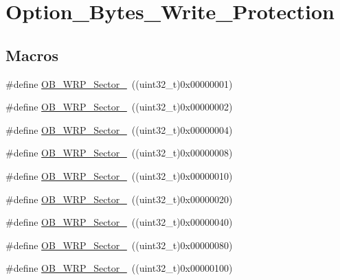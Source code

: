 \hypertarget{group___option___bytes___write___protection}{\section{Option\-\_\-\-Bytes\-\_\-\-Write\-\_\-\-Protection}
\label{group___option___bytes___write___protection}
}
\subsection*{Macros}
\begin{DoxyCompactItemize}
\item 
\#define \hyperlink{group___option___bytes___write___protection_gaff0ba34d35179bdc6e2f09d6813290f6}{O\-B\-\_\-\-W\-R\-P\-\_\-\-Sector\-\_}~((uint32\-\_\-t)0x00000001)
\item 
\#define \hyperlink{group___option___bytes___write___protection_gac9644173d5d7d5f67f5b623fcfb3b40f}{O\-B\-\_\-\-W\-R\-P\-\_\-\-Sector\-\_}~((uint32\-\_\-t)0x00000002)
\item 
\#define \hyperlink{group___option___bytes___write___protection_ga7753cebe1a52745ff90147970f7ec32e}{O\-B\-\_\-\-W\-R\-P\-\_\-\-Sector\-\_}~((uint32\-\_\-t)0x00000004)
\item 
\#define \hyperlink{group___option___bytes___write___protection_ga0c5703b7294cccd7a1db08075032c863}{O\-B\-\_\-\-W\-R\-P\-\_\-\-Sector\-\_}~((uint32\-\_\-t)0x00000008)
\item 
\#define \hyperlink{group___option___bytes___write___protection_gabb50050de92ef1fb2d0d0927323d8206}{O\-B\-\_\-\-W\-R\-P\-\_\-\-Sector\-\_}~((uint32\-\_\-t)0x00000010)
\item 
\#define \hyperlink{group___option___bytes___write___protection_gae1d6cf3e35d5a75934dec6ce9a5e33c3}{O\-B\-\_\-\-W\-R\-P\-\_\-\-Sector\-\_}~((uint32\-\_\-t)0x00000020)
\item 
\#define \hyperlink{group___option___bytes___write___protection_ga383d910c0be9c8ec4577b4fd4a6c8954}{O\-B\-\_\-\-W\-R\-P\-\_\-\-Sector\-\_}~((uint32\-\_\-t)0x00000040)
\item 
\#define \hyperlink{group___option___bytes___write___protection_ga23f59fa8ec37ea1072e617ac50f09632}{O\-B\-\_\-\-W\-R\-P\-\_\-\-Sector\-\_}~((uint32\-\_\-t)0x00000080)
\item 
\#define \hyperlink{group___option___bytes___write___protection_gaf351164510a07ba8cdcfde8473100c05}{O\-B\-\_\-\-W\-R\-P\-\_\-\-Sector\-\_}~((uint32\-\_\-t)0x00000100)

\end{DoxyCompactItemize}
